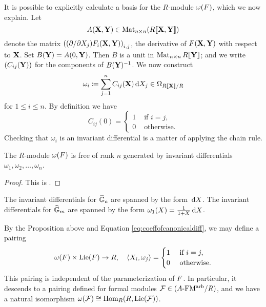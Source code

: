 \documentclass[../main.tex]{subfiles}
\begin{document}
It is possible to explicitly calculate a basis for the $R$-module
$\omega({F})$, which we now explain. Let 
$$A(\mathbf{X}, \mathbf{Y}) \in \operatorname{Mat}_{n \times n} (R\llbracket \mathbf{X}, \mathbf{Y} \rrbracket)$$ 
denote the matrix $\left((\partial/\partial X_j)F_i (\mathbf{X},\mathbf{Y})\right)_{i,j}$,
the derivative of ${F}(\mathbf{X},\mathbf{Y})$ with respect to $\mathbf{X}$. Set 
$B(\mathbf{Y}) = A(0,\mathbf{Y})$. Then $B$ is a unit in $\operatorname{Mat}_{n \times n} R\llbracket \mathbf{Y} \rrbracket$; 
and we write $(C_{ij}(\mathbf{Y}))$ for the components of 
$B(\mathbf{Y})^{-1}$. We now construct 
$$\omega_{i} \coloneqq \sum_{j=1}^n C_{ij}(\mathbf{X}) \, \mathrm{d} X_j \in \Omega_{R\llbracket \mathbf{X} \rrbracket/R}$$ 
for $1 \leq i \leq n$. By definition we have 
\begin{equation}\label{eq:coeffofcanonicaldiff}
  C_{ij}(0) = \begin{cases}
    1 &\text{ if }i = j,\\
    0 &\text{ otherwise.}
  \end{cases}
\end{equation}
Checking that $\omega_{i}$ is an invariant differential is a matter of 
applying the chain rule. 
\begin{prop}
    The $R$-module $\omega({F})$ is free of rank $n$ generated by invariant differentials
    $\omega_{1}, \omega_{2}, \dots, \omega_{n}$.
\begin{proof}
  This is \cite[Proposition 1.1]{honda1970formalgroups}. 
\end{proof}
\end{prop}
\begin{xpl}
  The invariant differentials for $\widehat{\mathbb{G}}_a$ are spanned by the form $\, \mathrm{d} X$. 
  The invariant differentials for $\widehat{\mathbb{G}}_m$ are spanned by the form 
  $\omega_1(X) = \frac 1{1+X} \, \mathrm{d} X$.
\end{xpl}
By the Proposition above and Equation \eqref{eq:coeffofcanonicaldiff}, we may
define a pairing
\begin{equation*}
  \omega({F}) \times \operatorname{Lie}({F}) \to R, \quad \langle X_i, \omega_j \rangle =
  \begin{cases}
    1 &\text{ if } i = j,\\
    0 &\text{ otherwise.}
  \end{cases}
\end{equation*}
This pairing is independent of the parameterization of ${F}$. In particular, it
descends to a pairing defined for formal modules $\mathcal{F} \in {({A}\text-\allowbreak\mathrm{FM^{arb}}/{R})}$, and
we have a natural isomorphism $\omega(\mathcal{F}) \cong \operatorname{Hom}_R(R, \operatorname{Lie}(\mathcal{F}))$.
\end{document}
